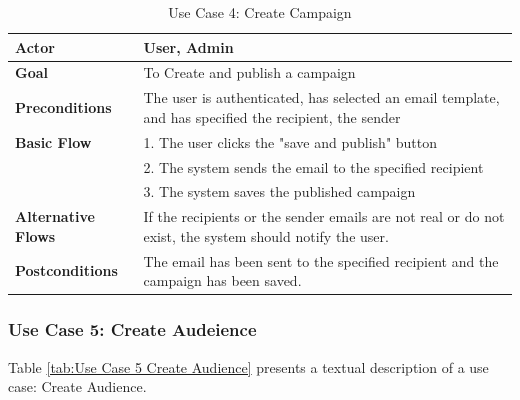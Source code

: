 \begin{table}[ht]
	\centering
	\begin{tabularx}{\textwidth}{|l|X|}
		\hline
		\textbf{Actor}             & User, Admin                                                                                             \\
		\hline
		\textbf{Goal}              & To Create and publish a campaign                                                                        \\
		\hline
		\textbf{Preconditions}     & The user is authenticated, has selected an email template, and has specified the recipient, the sender  \\
		\hline
		\textbf{Basic Flow}        & 1. The user clicks the "save and publish" button                                                        \\
		                           & 2. The system sends the email to the specified recipient                                                \\
		                           & 3. The system saves the published campaign                                                              \\
		\hline
		\textbf{Alternative Flows} & If the recipients or the sender emails are not real or do not exist, the system should notify the user. \\
		\hline
		\textbf{Postconditions}    & The email has been sent to the specified recipient and the campaign has been saved.                     \\
		\hline
	\end{tabularx}
	\caption{Use Case 4: Create Campaign}
	\label{tab:Use Case 4 Create Campaign}
\end{table}



\subsubsection{Use Case 5: Create Audeience}

Table \ref{tab:Use Case 5 Create Audience} presents a textual description of a use case: Create Audience.

